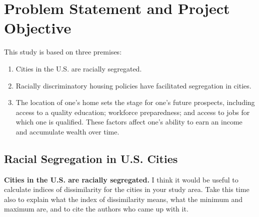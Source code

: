 \documentclass[paper=letter, fontsize=12pt]{scrartcl} %
\begin{document}
\section{Problem Statement and Project Objective}
This study is based on three premises:
\begin{enumerate}
	\item Cities in the U.S. are racially segregated.
	\item Racially discriminatory housing policies have facilitated segregation in cities.
	\item The location of one's home sets the stage for one's future prospects, including access to a quality education; workforce preparedness; and access to jobs for which one is qualified. These factors affect one's ability to earn an income and accumulate wealth over time.
\end{enumerate}

\subsection{Racial Segregation in U.S. Cities}
\textbf{Cities in the U.S. are racially segregated.} I think it would be useful to calculate indices of dissimilarity for the cities in your study area. Take this time also to explain what the index of dissimilarity means, what the minimum and maximum are, and to cite the authors who came up with it.\par
\end{document}
